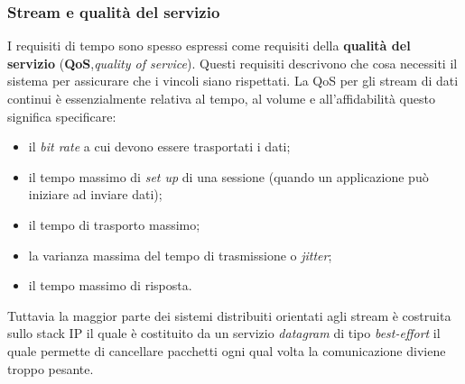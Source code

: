 \subsubsection{Stream e qualità del servizio}
I requisiti di tempo sono spesso espressi come requisiti della \textbf{qualità del servizio} (\textbf{QoS},\emph{quality of service}). Questi requisiti descrivono che cosa necessiti il sistema per assicurare che i vincoli siano rispettati. La QoS per gli stream di dati continui è essenzialmente relativa al tempo, al volume e all'affidabilità questo significa specificare:
\begin{itemize}
\item il \emph{bit rate} a cui devono essere trasportati i dati;
\item il tempo massimo di \emph{set up} di una sessione (quando un applicazione può iniziare ad inviare dati);
\item il tempo di trasporto massimo;
\item la varianza massima del tempo di trasmissione o \emph{jitter};
\item il tempo massimo di risposta.
\end{itemize}
Tuttavia la maggior parte dei sistemi distribuiti orientati agli stream è costruita sullo stack IP il quale è costituito da un servizio \emph{datagram} di tipo \emph{best-effort}  il quale permette di cancellare pacchetti ogni qual volta la comunicazione diviene troppo pesante.
